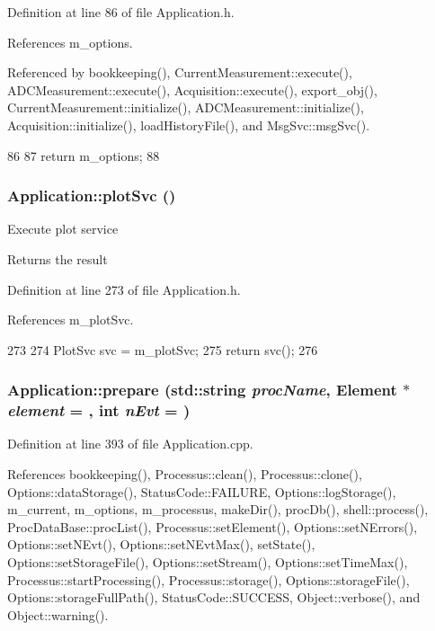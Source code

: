 Definition at line 86 of file Application.h.

References m\_\-options.

Referenced by bookkeeping(), CurrentMeasurement::execute(), ADCMeasurement::execute(), Acquisition::execute(), export\_\-obj(), CurrentMeasurement::initialize(), ADCMeasurement::initialize(), Acquisition::initialize(), loadHistoryFile(), and MsgSvc::msgSvc().


\begin{DoxyCode}
86                       {
87     return m_options;
88   }
\end{DoxyCode}
\hypertarget{classApplication_a6344c22495ff3e87d77d0c47aea3bf00}{
\subsubsection[{plotSvc}]{ Application::plotSvc ()}}
\label{classApplication_a6344c22495ff3e87d77d0c47aea3bf00}
Execute plot service \begin{DoxyReturn}{Returns}
the result 
\end{DoxyReturn}


Definition at line 273 of file Application.h.

References m\_\-plotSvc.


\begin{DoxyCode}
273                         {
274     PlotSvc svc = m_plotSvc;
275     return svc();
276   }
\end{DoxyCode}
\hypertarget{classApplication_a61dcc20b7f4b7c19b697db7516a62afa}{
\subsubsection[{prepare}]{ Application::prepare (std::string {\em procName}, \/  {\bf Element} $\ast$ {\em element} = {}, \/  int {\em nEvt} = {})}}
\label{classApplication_a61dcc20b7f4b7c19b697db7516a62afa}


Definition at line 393 of file Application.cpp.

References bookkeeping(), Processus::clean(), Processus::clone(), Options::dataStorage(), StatusCode::FAILURE, Options::logStorage(), m\_\-current, m\_\-options, m\_\-processus, makeDir(), procDb(), shell::process(), ProcDataBase::procList(), Processus::setElement(), Options::setNErrors(), Options::setNEvt(), Options::setNEvtMax(), setState(), Options::setStorageFile(), Options::setStream(), Options::setTimeMax(), Processus::startProcessing(), Processus::storage(), Options::storageFile(), Options::storageFullPath(), StatusCode::SUCCESS, Object::verbose(), and Object::warning().

